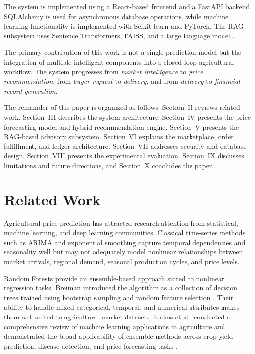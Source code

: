 \documentclass[conference]{IEEEtran}
\begin{document}
The system is implemented using a React-based frontend and a FastAPI
backend. SQLAlchemy is used for asynchronous database operations,
while machine learning functionality is implemented with Scikit-learn
and PyTorch. The RAG subsystem uses Sentence Transformers, FAISS,
and a large language model \cite{lewis2020}.

The primary contribution of this work is not a single prediction
model but the integration of multiple intelligent components into a
closed-loop agricultural workflow. The system progresses from
\emph{market intelligence} to \emph{price recommendation}, from
\emph{buyer request} to \emph{delivery}, and from \emph{delivery}
to \emph{financial record generation}.

The remainder of this paper is organized as follows. Section~II
reviews related work. Section~III describes the system architecture.
Section~IV presents the price forecasting model and hybrid
recommendation engine. Section~V presents the RAG-based advisory
subsystem. Section~VI explains the marketplace, order fulfillment,
and ledger architecture. Section~VII addresses security and database
design. Section~VIII presents the experimental evaluation.
Section~IX discusses limitations and future directions, and
Section~X concludes the paper.

\section{Related Work}

Agricultural price prediction has attracted research attention from
statistical, machine learning, and deep learning communities.
Classical time-series methods such as ARIMA and exponential smoothing
capture temporal dependencies and seasonality well but may not
adequately model nonlinear relationships between market arrivals,
regional demand, seasonal production cycles, and price levels.

Random Forests provide an ensemble-based approach suited to nonlinear
regression tasks. Breiman introduced the algorithm as a collection
of decision trees trained using bootstrap sampling and random feature
selection \cite{breiman2001}. Their ability to handle mixed
categorical, temporal, and numerical attributes makes them
well-suited to agricultural market datasets. Liakos et al.\
conducted a comprehensive review of machine learning applications
in agriculture and demonstrated the broad applicability of ensemble
methods across crop yield prediction, disease detection, and price
forecasting tasks \cite{liakos2018}.
\end{document}
